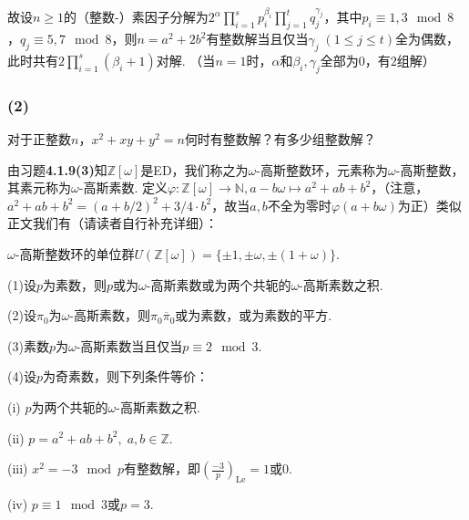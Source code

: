 故设$n\geq 1$的（整数-）素因子分解为$2^{\alpha}\prod_{i=1}^sp_i^{\beta_i}\prod_{j=1}^tq_j^{\gamma_j}$，其中$p_i\equiv 1,3\mod 8$，$q_j\equiv 5,7\mod 8$，则$n=a^2+2b^2$有整数解当且仅当$\gamma_j\;(1\leq j\leq t)$全为偶数，此时共有$2\prod_{i=1}^s(\beta_i+1)$对解. （当$n=1$时，$\alpha$和$\beta_i, \gamma_j$全部为$0$，有$2$组解）


\subsubsection{(2)}
对于正整数$n$，$x^2+xy+y^2=n$何时有整数解？有多少组整数解？


\jie 由{\heiti 习题}\textbf{4.1.9(3)}知$\mathbb{Z}[\omega]$是ED，我们称之为$\omega$-高斯整数环，元素称为$\omega$-高斯整数，其素元称为$\omega$-高斯素数. 定义$\varphi: \mathbb{Z}[\omega]\rightarrow\mathbb{N}, a-b\omega\mapsto a^2+ab+b^2$，（注意，$a^2+ab+b^2=(a+b/2)^2+3/4\cdot b^2$，故当$a,b$不全为零时$\varphi(a+b\omega)$为正）类似正文我们有（请读者自行补充详细）：

$\omega$-高斯整数环的单位群$U(\mathbb{Z}[\omega])=\{\pm 1, \pm\omega, \pm(1+\omega)\}$.

(1)设$p$为素数，则$p$或为$\omega$-高斯素数或为两个共轭的$\omega$-高斯素数之积.

(2)设$\pi_0$为$\omega$-高斯素数，则$\pi_0\overline{\pi}_0$或为素数，或为素数的平方.

(3)素数$p$为$\omega$-高斯素数当且仅当$p\equiv 2\mod 3$.

(4)设$p$为奇素数，则下列条件等价：

(i) $p$为两个共轭的$\omega$-高斯素数之积.

(ii) $p=a^2+ab+b^2,\;a,b\in\mathbb{Z}.$

(iii) $x^2=-3\mod p$有整数解，即$\left(\frac{-3}{p}\right)_{\mathrm{Le}}=1$或$0$.

(iv) $p\equiv 1\mod 3$或$p=3$.


